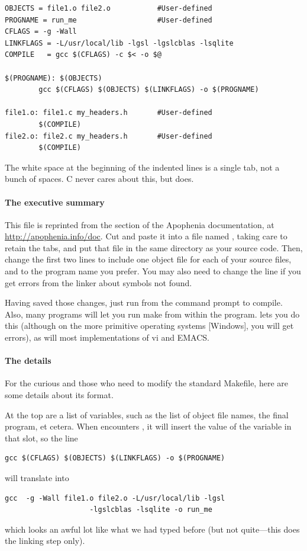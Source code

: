\documentclass[12pt]{article}
\def\ind#1{\index{#1}#1}
\begin{document}
\begin{verbatim}
OBJECTS = file1.o file2.o           #User-defined
PROGNAME = run_me                   #User-defined
CFLAGS = -g -Wall
LINKFLAGS = -L/usr/local/lib -lgsl -lgslcblas -lsqlite
COMPILE   = gcc $(CFLAGS) -c $< -o $@

$(PROGNAME): $(OBJECTS)
        gcc $(CFLAGS) $(OBJECTS) $(LINKFLAGS) -o $(PROGNAME)

file1.o: file1.c my_headers.h       #User-defined
        $(COMPILE)
file2.o: file2.c my_headers.h       #User-defined
        $(COMPILE)
\end{verbatim}

The white space at the beginning of the indented lines is a single tab,
not a bunch of spaces.  C never cares about this, but 
does.

\paragraph{The executive summary} This file is reprinted from the 
section of the Apophenia documentation, at
\url{http://apophenia.info/doc}. Cut and paste it into a file named
, taking care to retain the tabs, and put that file in
the same directory as your source code. Then, change the first two lines
to include one object file for each of your source files, and
to the program name you prefer.  You may also need to change the
 line if you get errors from the linker about symbols
not found.

Having saved those changes, just run
 from the command prompt to compile.
Also, many programs will let you run
make from within the program.  lets you do this (although on
the more primitive operating systems [Windows], you will get errors),
as will most implementations of \ind{vi} and \ind{EMACS}.


\paragraph{The details} For the curious and those who need to modify
the standard Makefile, here are some details about its format.

At the top are a list of variables, such as the list of object file names, the final program, et cetera.
When  encounters , it will insert the value of the variable  in that
slot, so the line 
\begin{verbatim}
gcc $(CFLAGS) $(OBJECTS) $(LINKFLAGS) -o $(PROGNAME)
\end{verbatim}
will translate into
\begin{verbatim}
gcc  -g -Wall file1.o file2.o -L/usr/local/lib -lgsl 
                    -lgslcblas -lsqlite -o run_me
\end{verbatim}
which looks an awful lot like what we had typed before (but not quite---this does the linking step only).
\end{document}
